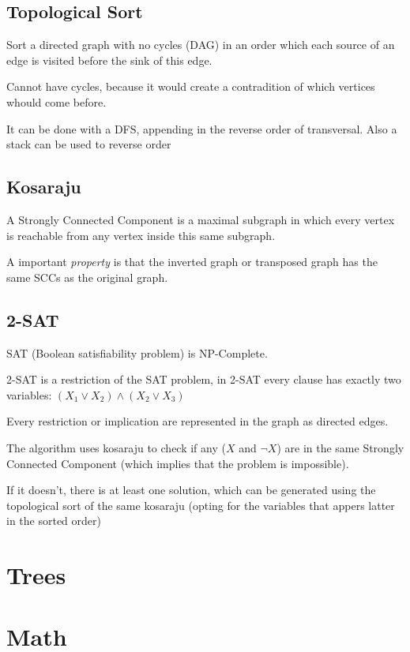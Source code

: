 	\subsection{Topological Sort}

	Sort a directed graph with no cycles (DAG) in an order which each source of an edge is visited before the sink of this edge.

	Cannot have cycles, because it would create a contradition of which vertices whould come before.

	It can be done with a DFS, appending in the reverse order of transversal. Also a stack can be used to reverse order	


	\subsection{Kosaraju}

	A Strongly Connected Component is a maximal subgraph in which every vertex is reachable
	from any vertex inside this same subgraph.

	A important \textit{property} is that the inverted graph or transposed graph has the same SCCs
	as the original graph.


	\subsection{2-SAT}
	
		SAT (Boolean satisfiability problem) is NP-Complete.

		2-SAT is a restriction of the SAT problem, in 2-SAT every clause has exactly two variables:
		$ (X_1 \vee X_2) \wedge (X_2 \vee X_3) $

		Every restriction or implication are represented in the graph as directed edges.

		The algorithm uses kosaraju to check if any ($X$ and $\neg{X}$) are in the same Strongly Connected Component 
		(which implies that the problem is impossible). 

		If it doesn't, there is at least one solution, which can be generated using the topological sort of the same kosaraju 
		(opting for the variables that appers latter in the sorted order)


\section{Trees}

\section{Math}
